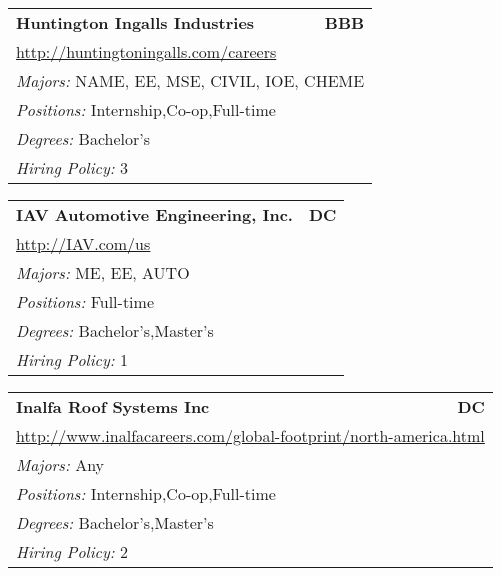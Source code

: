 \documentclass[twoside]{article}
\begin{document}
\begin{center}
\begin{multicols}{3}
\begin{FlushLeft}
\begin{minipage}{.9\columnwidth}
\end{minipage}
 
\begin{minipage}{.9\columnwidth}\begin{tabularx}{.95\columnwidth}{Xr}
                 {\Large\bf Huntington Ingalls Industries} & {\Large\bf BBB}\\
    \multicolumn{2}{p{.95\columnwidth}}{\url{http://huntingtoningalls.com/careers}}\\
    \multicolumn{2}{p{.95\columnwidth}}{\emph{Majors:} NAME, EE, MSE, CIVIL, IOE, CHEME}\\
    \multicolumn{2}{p{.95\columnwidth}}{\emph{Positions:} Internship,Co-op,Full-time}\\
    \multicolumn{2}{p{.95\columnwidth}}{\emph{Degrees:} Bachelor's}\\
    \multicolumn{2}{p{.95\columnwidth}}{\emph{Hiring Policy:} 3}\\
    \end{tabularx}
    
\end{minipage}
 
\begin{minipage}{.9\columnwidth}\begin{tabularx}{.95\columnwidth}{Xr}
                 {\Large\bf IAV Automotive Engineering, Inc.} & {\Large\bf DC}\\
    \multicolumn{2}{p{.95\columnwidth}}{\url{http://IAV.com/us}}\\
    \multicolumn{2}{p{.95\columnwidth}}{\emph{Majors:} ME, EE, AUTO}\\
    \multicolumn{2}{p{.95\columnwidth}}{\emph{Positions:} Full-time}\\
    \multicolumn{2}{p{.95\columnwidth}}{\emph{Degrees:} Bachelor's,Master's}\\
    \multicolumn{2}{p{.95\columnwidth}}{\emph{Hiring Policy:} 1}\\
    \end{tabularx}
    
\end{minipage}
 
\begin{minipage}{.9\columnwidth}\begin{tabularx}{.95\columnwidth}{Xr}
                 {\Large\bf Inalfa Roof Systems Inc} & {\Large\bf DC}\\
    \multicolumn{2}{p{.95\columnwidth}}{\url{http://www.inalfacareers.com/global-footprint/north-america.html}}\\
    \multicolumn{2}{p{.95\columnwidth}}{\emph{Majors:} Any}\\
    \multicolumn{2}{p{.95\columnwidth}}{\emph{Positions:} Internship,Co-op,Full-time}\\
    \multicolumn{2}{p{.95\columnwidth}}{\emph{Degrees:} Bachelor's,Master's}\\
    \multicolumn{2}{p{.95\columnwidth}}{\emph{Hiring Policy:} 2}\\
    \end{tabularx}
    

\end{minipage}
\end{FlushLeft}
\end{multicols}
\end{center}
\end{document}
